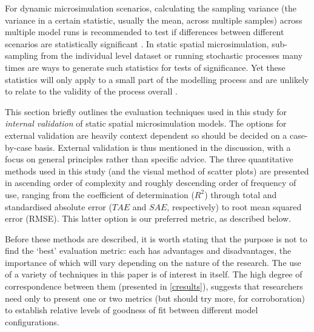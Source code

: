 \documentclass[a4paper,10pt]{article}
\begin{document}
For dynamic microsimulation scenarios,
calculating the sampling variance (the variance
in a certain statistic, usually the mean, across multiple samples)
across multiple model runs
is recommended to test if differences between different
scenarios are statistically significant \citep{goedeme2013testing}.
In static spatial
microsimulation, sub-sampling
from the individual level dataset or running stochastic processes
many times are ways to generate such statistics for tests
of significance. Yet these statistics will only apply to a small part
of the modelling process and are unlikely to relate to
the validity of the process overall \citep{Lovelace2013-trs}.

This section briefly outlines the evaluation techniques
used in this study for \emph{internal validation}
of static spatial microsimulation models.
The options for external
validation are heavily context dependent so should be decided on a
case-by-case basis.
External validation is thus mentioned in the discussion,
with a focus on general principles
rather than specific advice. The three quantitative
methods used in this study (and the visual method of scatter plots)
are presented in ascending order of complexity
and roughly descending order of frequency of use, ranging from 
the coefficient of determination ($R^2$) through total and standardised
absolute error ($TAE$ and $SAE$, respectively)
to root mean squared error (RMSE).
This latter option is our preferred metric, as described below.

Before these methods are described, it is
worth stating that the purpose is not to find the `best' evaluation metric:
each has advantages and disadvantages, the importance of which will vary depending on the
nature of the research. The use of a variety of techniques in this paper
is of interest in itself. The high degree of correspondence between them (presented in \cref{cresults}),
suggests that researchers need only to present one or two metrics (but should
try more, for corroboration)
to establish relative levels of goodness of fit between
different model configurations.
\end{document}
